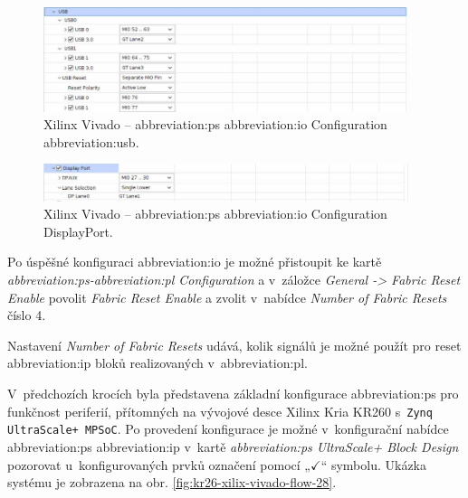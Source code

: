 \documentclass[a4paper, twoside, 11pt]{article}
\newcommand{\fbar}{\FloatBarrier}
\begin{document}
				\begin{figure}[htbp!]
					\centering
					\includegraphics[width=0.95\textwidth]{src/png/kr26-xilinx-vivado-flow/kr26-xilix-vivado-flow-25.jpg}
					\caption{Xilinx Vivado – \gls{abbreviation:ps} \gls{abbreviation:io} Configuration \gls{abbreviation:usb}.}
					\label{fig:kr26-xilix-vivado-flow-25}
				\end{figure}

				\begin{figure}[htbp!]
					\centering
					\includegraphics[width=0.95\textwidth]{src/png/kr26-xilinx-vivado-flow/kr26-xilix-vivado-flow-26.jpg}
					\caption{Xilinx Vivado – \gls{abbreviation:ps} \gls{abbreviation:io} Configuration DisplayPort.}
					\label{fig:kr26-xilix-vivado-flow-26}
				\end{figure}

				\fbar
				Po úspěšné konfiguraci \gls{abbreviation:io} je možné přistoupit ke kartě \textit{\gls{abbreviation:ps}-\gls{abbreviation:pl} Configuration} a v~záložce \textit{General -> Fabric Reset Enable} povolit \textit{Fabric Reset Enable} a zvolit v~nabídce \textit{Number of Fabric Resets} číslo 4.\par
				Nastavení \textit{Number of Fabric Resets} udává, kolik signálů je možné použít pro reset \gls{abbreviation:ip} bloků realizovaných v~\gls{abbreviation:pl}. \cite{xilinx-ultra-scale-plus-mpsoc-processing-syste-product-guide} \cite{xilinx-wiki-atlassian-zynq-ultra-scale-plus-mpsoc-restart-solution}\par

				V~předchozích krocích byla představena základní konfigurace \gls{abbreviation:ps} pro funkčnost periferií, přítomných na vývojové desce Xilinx Kria KR260 s~\texttt{Zynq UltraScale+ MPSoC}. Po provedení konfigurace je možné v~konfigurační nabídce \gls{abbreviation:ps} \gls{abbreviation:ip} v~kartě \textit{\gls{abbreviation:ps} UltraScale+ Block Design} pozorovat u~konfigurovaných prvků označení pomocí „$\checkmark$“ symbolu. Ukázka systému je zobrazena na obr. \ref{fig:kr26-xilix-vivado-flow-28}.
\end{document}
